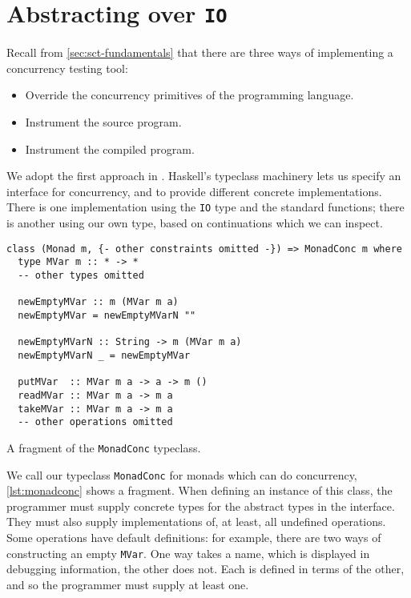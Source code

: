 \section{Abstracting over \texttt{IO}}
\label{sec:dejafu-monadconc}

Recall from \cref{sec:sct-fundamentals} that there are three ways of
implementing a concurrency testing tool:

\begin{itemize}
\item Override the concurrency primitives of the programming language.
\item Instrument the source program.
\item Instrument the compiled program.
\end{itemize}

We adopt the first approach in \dejafu{}.  Haskell's typeclass machinery lets us
specify an interface for concurrency, and to provide different concrete
implementations.  There is one implementation using the \verb|IO| type and the
standard functions; there is another using our own type, based on continuations
which we can inspect.

\begin{listing}
  \begin{verbatim}
class (Monad m, {- other constraints omitted -}) => MonadConc m where
  type MVar m :: * -> *
  -- other types omitted

  newEmptyMVar :: m (MVar m a)
  newEmptyMVar = newEmptyMVarN ""

  newEmptyMVarN :: String -> m (MVar m a)
  newEmptyMVarN _ = newEmptyMVar

  putMVar  :: MVar m a -> a -> m ()
  readMVar :: MVar m a -> m a
  takeMVar :: MVar m a -> m a
  -- other operations omitted
  \end{verbatim}
  \caption{A fragment of the \texttt{MonadConc} typeclass.}\label{lst:monadconc}
\end{listing}

We call our typeclass \verb|MonadConc| for monads which can do concurrency,
\cref{lst:monadconc} shows a fragment.  When defining an instance of this class,
the programmer must supply concrete types for the abstract types in the
interface.  They must also supply implementations of, at least, all undefined
operations.  Some operations have default definitions: for example, there are
two ways of constructing an empty \verb|MVar|.  One way takes a name, which is
displayed in debugging information, the other does not.  Each is defined in
terms of the other, and so the programmer must supply at least one.

